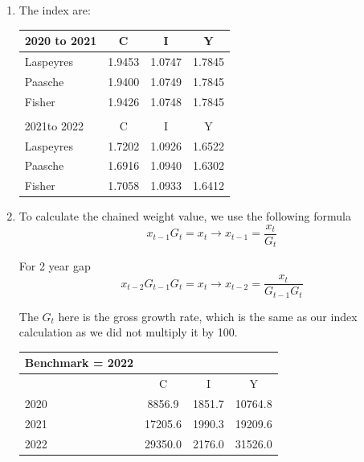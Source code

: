\documentclass[14pt, oneside]{memoir}
\begin{document}
\begin{enumerate}[label=\textbf{\arabic*.}, itemsep=15pt]
\begin{enumerate}[label=(\alph*)]
	\item The index are:
	\begin{table}[htbp]
		\centering
		\begin{tabular}{lccc}
			2020 to 2021 & C     & I     & Y \\ \hline
			Laspeyres & 1.9453 & 1.0747 & 1.7845 \\
			Paasche & 1.9400 & 1.0749 & 1.7845 \\
			Fisher & 1.9426 & 1.0748 & 1.7845 \\ \hline
			&       &       &  \\
			2021to 2022 & C     & I     & Y \\ \hline
			Laspeyres & 1.7202 & 1.0926 & 1.6522 \\
			Paasche & 1.6916 & 1.0940 & 1.6302 \\
			Fisher & 1.7058 & 1.0933 & 1.6412 \\ \hline
		\end{tabular}%
	\end{table}%
	
	
	
	\clearpage
	
	\item 	
	To calculate the chained weight value, we use the following formula
	\[x_{t-1}G_t = x_t \to x_{t-1} = \frac{x_t}{G_t}\]
	
	For 2 year gap
	\[x_{t-2}G_{t-1}G_{t} = x_t \to x_{t-2} = \frac{x_t}{G_{t-1}G_t}\]
	
	The $G_t$ here is the gross growth rate, which is the same as our index calculation as we did not multiply it by 100.
	
	\begin{table}[htbp]
		\centering
		    \begin{tabular}{lccc}
			Benchmark = 2022 &       &       &  \\ \hline
			& C     & I     & Y \\ \hline
			2020  & 8856.9 & 1851.7 & 10764.8 \\
			2021  & 17205.6 & 1990.3 & 19209.6 \\
			2022  & 29350.0 & 2176.0 & 31526.0 \\ \hline
		\end{tabular}%
	\end{table}%
	

\end{enumerate}
\end{enumerate}
\end{document}
